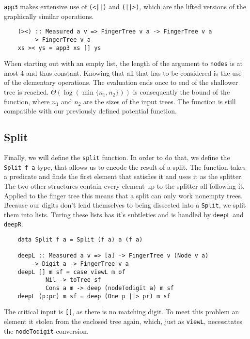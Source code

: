 \texttt{app3} makes extensive use of \texttt{(<||)} and \texttt{(||>)}, which are the lifted versions of the graphically similar operations.

\begin{verbatim}
    (><) :: Measured a v => FingerTree v a -> FingerTree v a
        -> FingerTree v a
    xs >< ys = app3 xs [] ys
\end{verbatim}

When starting out with an empty list, the length of the argument to \texttt{nodes} is at most 4 and thus constant. Knowing that all that has to be considered is the use of the elementary operations. The evaluation ends once to end of the shallower tree is reached. \(\Theta(\log(\min\{n_1,n_2\}))\) is consequently the bound of the function, where \(n_1\) and \(n_2\) are the sizes of the input trees. The function is still compatible with our previously defined potential function.\par

\subsection{Split}

Finally, we will define the \texttt{split} function. In order to do that, we define the \texttt{Split f a} type, that allows us to encode the result of a split. The function takes a predicate and finds the first element that satisfies it and uses it as the splitter. The two other structures contain every element up to the splitter all following it. Applied to the finger tree this means that a split can only work nonempty trees. Because our digits don't lend themselves to being dissected into a \texttt{Split}, we split them into lists. Turing these lists has it's subtleties and is handled by \texttt{deepL} and \texttt{deepR}.

\begin{verbatim}
    data Split f a = Split (f a) a (f a)

    deepL :: Measured a v => [a] -> FingerTree v (Node v a)
        -> Digit a -> FingerTree v a
    deepL [] m sf = case viewL m of
            Nil -> toTree sf
            Cons a m -> deep (nodeTodigit a) m sf
    deepL (p:pr) m sf = deep (One p ||> pr) m sf
\end{verbatim}

The critical input is \texttt{[]}, as there is no matching digit. To meet this problem
    an element it stolen from the enclosed tree again, which, just as \texttt{viewL}, necessitates the \texttt{nodeTodigit} conversion.

